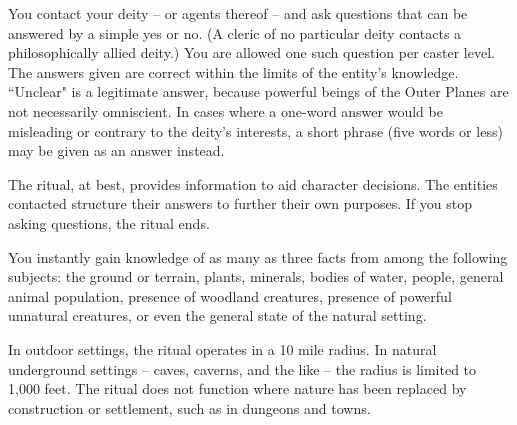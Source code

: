 \spelldur{\durmed}
\begin{spelleffect}
You contact your deity -- or agents thereof -- and ask questions that can be answered by a simple yes or no. (A cleric of no particular deity contacts a philosophically allied deity.) You are allowed one such question per caster level. The answers given are correct within the limits of the entity's knowledge. ``Unclear" is a legitimate answer, because powerful beings of the Outer Planes are not necessarily omniscient. In cases where a one-word answer would be misleading or contrary to the deity's interests, a short phrase (five words or less) may be given as an answer instead.
\par The ritual, at best, provides information to aid character decisions. The entities contacted structure their answers to further their own purposes. If you stop asking questions, the ritual ends.
\end{spelleffect}

\begin{spelleffect}
You instantly gain knowledge of as many as three facts from among the following subjects: the ground or terrain, plants, minerals, bodies of water, people, general animal population, presence of woodland creatures, presence of powerful unnatural creatures, or even the general state of the natural setting.
\par In outdoor settings, the ritual operates in a 10 mile radius. In natural underground settings -- caves, caverns, and the like -- the radius is limited to 1,000 feet. The ritual does not function where nature has been replaced by construction or settlement, such as in dungeons and towns.
\end{spelleffect}

